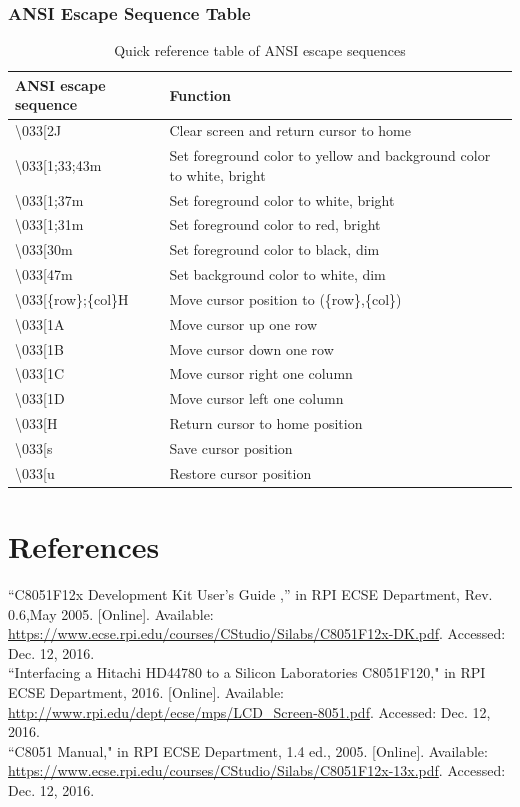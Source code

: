 \documentclass[12pt]{article}
\begin{document}
\subsubsection{ANSI Escape Sequence Table}
\begin{table}[h]
	\centering
	\begin{tabular}{|l|l|}
		\hline
		ANSI escape sequence & Function \\ \hline
		\textbackslash033[2J & Clear screen and return cursor to home \\ \hline
		\textbackslash033[1;33;43m & Set foreground color to yellow and background color to white, bright \\ \hline
		\textbackslash033[1;37m & Set foreground color to white, bright\\ \hline
		\textbackslash033[1;31m & Set foreground color to red, bright\\ \hline
		\textbackslash033[30m & Set foreground color to black, dim\\ \hline
		\textbackslash033[47m & Set background color to white, dim\\ \hline
		\textbackslash033[\{row\};\{col\}H & Move cursor position to (\{row\},\{col\})\\ \hline
		\textbackslash033[1A & Move cursor up one row \\ \hline
		\textbackslash033[1B & Move cursor down one row \\ \hline
		\textbackslash033[1C & Move cursor right one column \\ \hline
		\textbackslash033[1D & Move cursor left one column \\ \hline
		\textbackslash033[H & Return cursor to home position\\ \hline
		\textbackslash033[s & Save cursor position\\ \hline
		\textbackslash033[u & Restore cursor position\\ \hline

	\end{tabular}
	\caption{Quick reference table of ANSI escape sequences}
	\label{ANSI}
\end{table}
\section{References} 
\noindent
[1]``C8051F12x Development Kit User's Guide ,'' in RPI ECSE Department, Rev. 0.6,May 2005. [Online]. Available: \url{https://www.ecse.rpi.edu/courses/CStudio/Silabs/C8051F12x-DK.pdf}. Accessed: Dec. 12, 2016.\\
\newline\noindent
[2]``Interfacing a Hitachi HD44780 to a Silicon Laboratories C8051F120," in RPI ECSE Department, 2016. [Online]. Available: \url{http://www.rpi.edu/dept/ecse/mps/LCD_Screen-8051.pdf}. Accessed: Dec. 12, 2016.\\
\newline\noindent
[3]``C8051 Manual," in RPI ECSE Department, 1.4 ed., 2005. [Online]. Available: \url{https://www.ecse.rpi.edu/courses/CStudio/Silabs/C8051F12x-13x.pdf}. Accessed: Dec. 12, 2016.
\end{document}
